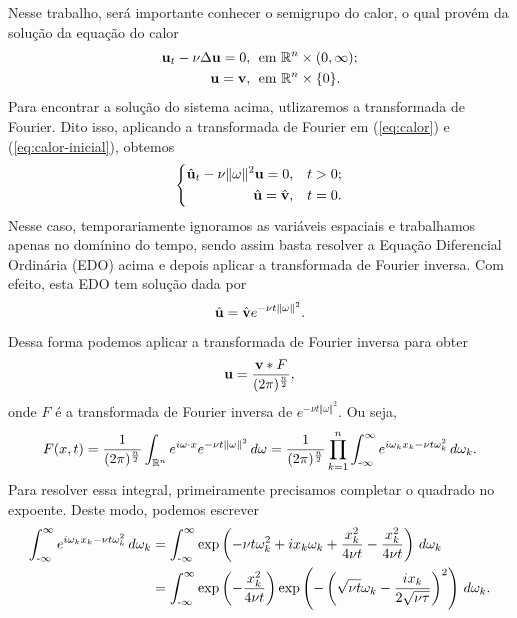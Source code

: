 Nesse trabalho, será importante conhecer o semigrupo do calor, o qual provém da solução da equação do calor
\begin{align}
    \mathbf{u}_t - \nu \Delta\mathbf{u} = 0,&\;\text{ em } \mathbb{R}^n \times (0,\infty); \label{eq:calor}\\
    \mathbf{u} = \mathbf{v}, &\;\text{ em } \mathbb{R}^n \times \{0\} \label{eq:calor-inicial}.
\end{align} 
Para encontrar a solução do sistema acima, utlizaremos a transformada de Fourier.
Dito isso, aplicando a transformada de Fourier em (\ref{eq:calor}) e (\ref{eq:calor-inicial}), obtemos
\[
    \left\{
        \begin{aligned}
        \hat{\mathbf{u}}_t - \nu \Vert \omega \Vert^2 \mathbf{u} = 0, &\quad t > 0;\\
        \hat{\mathbf{u}} = \hat{\mathbf{v}}, &\quad t = 0.
        \end{aligned}
    \right.
\]
Nesse caso, temporariamente ignoramos as variáveis espaciais e trabalhamos apenas no domínino do tempo, sendo assim basta resolver a Equação Diferencial Ordinária (EDO) acima e depois aplicar a transformada de Fourier inversa.
Com efeito, esta EDO tem solução dada por
\[
    \hat{\mathbf{u}} = \hat{\mathbf{v}} e^{-\nu t \Vert \omega \Vert^2}.
\]
Dessa forma podemos aplicar a transformada de Fourier inversa para obter
\begin{equation} \label{eq:ls}
    \mathbf{u} = \frac{\mathbf{v} * F}{(2\pi)^{\frac{n}{2}}},
\end{equation}
onde $F$ é a transformada de Fourier inversa de $e^{-\nu t \Vert \omega \Vert^2}$. Ou seja,
\begin{equation} \label{eq:ssss}
    F(x,t) = \frac{1}{(2\pi)^\frac{n}{2}}\int_{\mathbb{R}^n} e^{i \omega \cdot x} e^{-\nu t \Vert \omega \Vert^2} \,d\omega =  \frac{1}{(2\pi)^\frac{n}{2}}\prod_{k=1}^n \int_{\text{-}\infty}^{\infty} e^{i \omega_k x_k - \nu t\omega_k^2} \,d\omega_k.
\end{equation}
Para resolver essa integral, primeiramente precisamos completar o quadrado no expoente.
Deste modo, podemos escrever
\[
    \begin{aligned}
        \int_{\text{-}\infty}^{\infty} e^{i \omega_k x_k - \nu t\omega_k^2} \,d\omega_k &= \int_{\text{-}\infty}^{\infty} \exp \left(-\nu t\omega_k^2 + i x_k\omega_k + \frac{x_k^2}{4\nu t} - \frac{x_k^2}{4\nu t}\right) \, d\omega_k\\
        &= \int_{\text{-}\infty}^\infty \exp\left( -\frac{x_k^2}{4\nu t} \right) \exp \left( - \left( \sqrt{\nu t}\omega_k - \frac{ix_k}{2\sqrt{\nu\tau}} \right)^2 \right) \,d\omega_k.
    \end{aligned}
\] 
